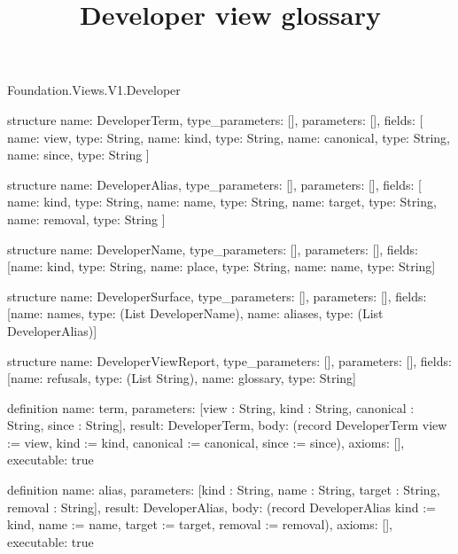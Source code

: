 \begin{lexlean}{Foundation.Views.V1.Developer}
\title{Developer view glossary}
\begin{semanticmodule}
structure{
  name: DeveloperTerm,
  type_parameters: [],
  parameters: [],
  fields: [
    {name: view, type: String},
    {name: kind, type: String},
    {name: canonical, type: String},
    {name: since, type: String}
  ]
}

structure{
  name: DeveloperAlias,
  type_parameters: [],
  parameters: [],
  fields: [
    {name: kind, type: String},
    {name: name, type: String},
    {name: target, type: String},
    {name: removal, type: String}
  ]
}

structure{
  name: DeveloperName,
  type_parameters: [],
  parameters: [],
  fields: [{name: kind, type: String}, {name: place, type: String}, {name: name, type: String}]
}

structure{
  name: DeveloperSurface,
  type_parameters: [],
  parameters: [],
  fields: [{name: names, type: (List DeveloperName)}, {name: aliases, type: (List DeveloperAlias)}]
}

structure{
  name: DeveloperViewReport,
  type_parameters: [],
  parameters: [],
  fields: [{name: refusals, type: (List String)}, {name: glossary, type: String}]
}

definition{
  name: term,
  parameters: [view : String, kind : String, canonical : String, since : String],
  result: DeveloperTerm,
  body: (record DeveloperTerm {view := view, kind := kind, canonical := canonical, since := since}),
  axioms: [],
  executable: true
}

definition{
  name: alias,
  parameters: [kind : String, name : String, target : String, removal : String],
  result: DeveloperAlias,
  body: (record DeveloperAlias {kind := kind, name := name, target := target, removal := removal}),
  axioms: [],
  executable: true
}


\end{semanticmodule}
\end{lexlean}
